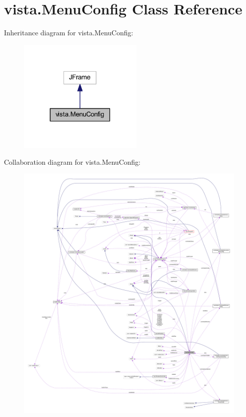 \hypertarget{classvista_1_1_menu_config}{}\section{vista.\+Menu\+Config Class Reference}
\label{classvista_1_1_menu_config}


Inheritance diagram for vista.\+Menu\+Config\+:
\nopagebreak
\begin{figure}[H]
\begin{center}
\leavevmode
\includegraphics[width=170pt]{classvista_1_1_menu_config__inherit__graph}
\end{center}
\end{figure}


Collaboration diagram for vista.\+Menu\+Config\+:
\nopagebreak
\begin{figure}[H]
\begin{center}
\leavevmode
\includegraphics[width=350pt]{classvista_1_1_menu_config__coll__graph}
\end{center}
\end{figure}
